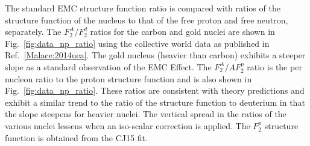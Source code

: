 \documentclass[oneside]{article}
\begin{document}
The standard EMC structure function ratio is compared with ratios of the structure function of the nucleus to that of the free proton and free neutron, separately. The $F_2^A/F_2^d$ ratios for the carbon and gold nuclei are shown in Fig.~\ref{fig:data_np_ratio} using the collective world data as published in Ref.~\ref{Malace:2014uea}. The gold nucleus (heavier than carbon) exhibits a steeper slope as a standard observation of the EMC Effect. The $F_2^A/AF_2^p$ ratio is the per nucleon ratio to the proton structure function and is also shown in Fig.~\ref{fig:data_np_ratio}. These ratios are consistent with theory predictions and exhibit a similar trend to the ratio of the structure function to deuterium in that the slope steepens for heavier nuclei. The vertical spread in the ratios of the various nuclei lessens when an iso-scalar correction is applied. The $F_2^p$ structure function is obtained from the CJ15 fit.      
 
\end{document}
